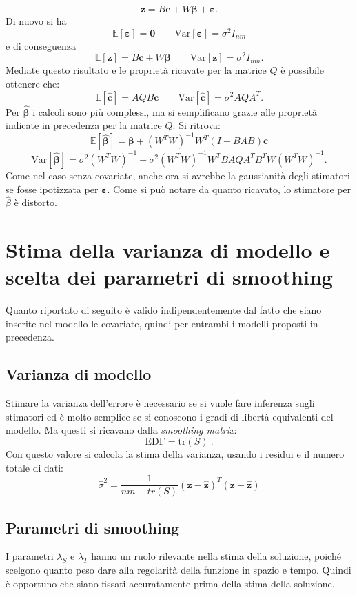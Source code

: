 \documentclass[a4paper,11pt,twoside,openright]{book}							%
\begin{document}
\begin{equation}
\label{eq:modellobasecovarmatric}
\bm z=B \bm c + W \bm \beta + \bm \varepsilon .
\end{equation}
Di nuovo si ha 
$$
\mathbb{E}[\bm \varepsilon] = \bm 0 \qquad \mathrm{Var}[\bm \varepsilon] = \sigma^2 I_{nm}
$$
e di conseguenza
$$
\mathbb{E}[\bm z] = B \bm c + W \bm \beta \qquad \mathrm{Var}[\bm z] = \sigma^2 I_{nm} .
$$
Mediate questo risultato e le proprietà ricavate per la matrice $Q$ è possibile ottenere che:
$$
\mathbb{E}[\hat  {\bm c}] = AQB \bm c \qquad \mathrm{Var}[\hat  {\bm c}] = \sigma^2 AQA^T .
$$
Per $\hat  {\bm \beta}$ i calcoli sono più complessi, ma si semplificano grazie alle proprietà indicate in precedenza per la matrice $Q$. Si ritrova:
$$
\mathbb{E}[\hat  {\bm \beta}] = \bm \beta + (W^TW)^{-1}W^T(I-B AB)\bm c
$$
$$ \mathrm{Var}[\hat  {\bm \beta}] = \sigma^2 (W^TW)^{-1} + \sigma^2 (W^TW)^{-1}W^T B A Q A^T B^T W(W^TW)^{-1}.
$$
Come nel caso senza covariate, anche ora si avrebbe la gaussianità degli stimatori se fosse ipotizzata per $\bm \varepsilon$. Come si può notare da quanto ricavato, lo stimatore per $\hat{\beta}$ è distorto.


\section{Stima della varianza di modello e scelta dei parametri di smoothing}
\label{sez:GCV}

Quanto riportato di seguito è valido indipendentemente dal fatto che siano inserite nel modello le covariate, quindi per entrambi i modelli proposti in precedenza.

\subsection{Varianza di modello}
Stimare la varianza dell'errore è necessario se si vuole fare inferenza sugli stimatori ed è molto semplice se si conoscono i gradi di libertà equivalenti del modello. Ma questi si ricavano dalla \textit{smoothing matrix}:
$$
\mathrm{EDF}=\mathrm{tr}(S) \ .
$$
Con questo valore si calcola la stima della varianza, usando i residui e il numero totale di dati:
$$
\hat{\sigma}^2=\frac{1}{nm-tr(S)}(\bm z - \hat  {\bm z})^T(\bm z - \hat  {\bm z})
$$

\subsection{Parametri di smoothing}
I parametri $\lambda_S$ e $\lambda_T$ hanno un ruolo rilevante nella stima della soluzione, poiché scelgono quanto peso dare alla regolarità della funzione in spazio e tempo. Quindi è opportuno che siano fissati accuratamente prima della stima della soluzione.
\end{document}
